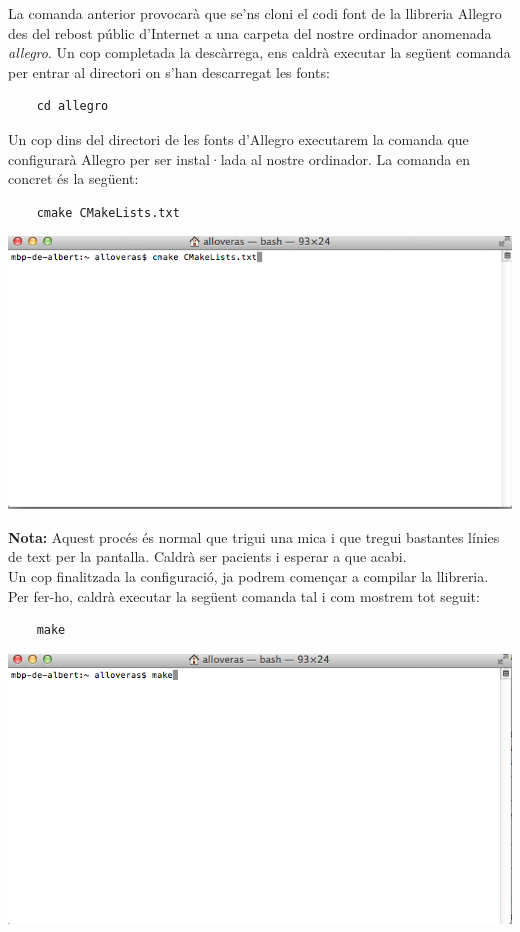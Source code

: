 \documentclass[11pt]{article}
\begin{document}
\noindent La comanda anterior provocarà que se'ns cloni el codi font de la llibreria Allegro des del rebost públic d'Internet a una carpeta del nostre ordinador anomenada \textit{allegro}. Un cop completada la descàrrega, ens caldrà executar la següent comanda per entrar al directori on s'han descarregat les fonts:

\begin{verbatim}
	cd allegro
\end{verbatim}

\noindent Un cop dins del directori de les fonts d'Allegro executarem la comanda que configurarà Allegro per ser instal·lada al nostre ordinador. La comanda en concret és la següent:

\begin{verbatim}
	cmake CMakeLists.txt
\end{verbatim}

\begin{center}
	\includegraphics[scale=0.5]{img/Configure.png}
\end{center}

\noindent \textbf{Nota:} Aquest procés és normal que trigui una mica i que tregui bastantes línies de text per la pantalla. Caldrà ser pacients i esperar a que acabi.\\

\newpage
\noindent Un cop finalitzada la configuració, ja podrem començar a compilar la llibreria. Per fer-ho, caldrà executar la següent comanda tal i com mostrem tot seguit:

\begin{verbatim}
	make
\end{verbatim}

\begin{center}
		\includegraphics[scale=0.5]{img/Make.png}
\end{center}
\end{document}

